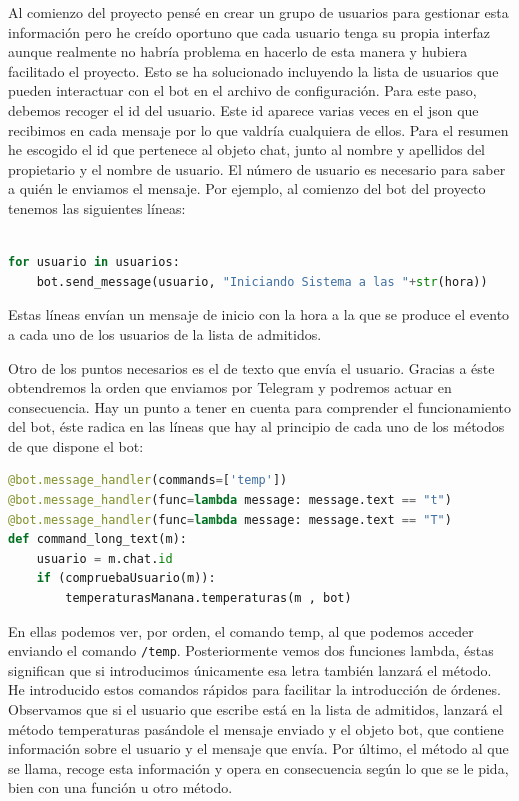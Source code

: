 Al comienzo del proyecto pensé en crear un grupo de usuarios para gestionar esta información pero he creído oportuno que cada usuario tenga su propia interfaz aunque realmente no habría problema en hacerlo de esta manera y hubiera facilitado el proyecto. Esto se ha solucionado incluyendo la lista de usuarios que pueden interactuar con el bot en el archivo de configuración. Para este paso, debemos recoger el id del usuario. Este id aparece varias veces en el json que recibimos en cada mensaje por lo que valdría cualquiera de ellos. Para el resumen he escogido el id que pertenece al objeto chat, junto al nombre y apellidos del propietario y el nombre de usuario.
El número de usuario es necesario para saber a quién le enviamos el mensaje. Por ejemplo, al comienzo del bot del proyecto tenemos las siguientes líneas:~\\~\\

\begin{lstlisting}[language=Python]
for usuario in usuarios:
    bot.send_message(usuario, "Iniciando Sistema a las "+str(hora))
\end{lstlisting}

Estas líneas envían un mensaje de inicio con la hora a la que se produce el evento a cada uno de los usuarios de la lista de admitidos.

Otro de los puntos necesarios es el de texto que envía el usuario. Gracias a éste obtendremos la orden que enviamos por Telegram y podremos actuar en consecuencia.
Hay un punto a tener en cuenta para comprender el funcionamiento del bot, éste radica en las líneas que hay al principio de cada uno de los métodos de que dispone el bot:~\\

\begin{lstlisting}[language=Python]
@bot.message_handler(commands=['temp'])
@bot.message_handler(func=lambda message: message.text == "t")
@bot.message_handler(func=lambda message: message.text == "T")
def command_long_text(m):
    usuario = m.chat.id
    if (compruebaUsuario(m)):
        temperaturasManana.temperaturas(m , bot)
\end{lstlisting}

En ellas podemos ver, por orden, el comando temp, al que podemos acceder enviando el comando \texttt{/temp}. Posteriormente vemos dos funciones lambda, éstas significan que si introducimos únicamente esa letra también lanzará el método. He introducido estos comandos rápidos para facilitar la introducción de órdenes.
Observamos que si el usuario que escribe está en la lista de admitidos, lanzará el método temperaturas pasándole el mensaje enviado y el objeto bot, que contiene información sobre el usuario y el mensaje que envía.
Por último, el método al que se llama, recoge esta información y opera en consecuencia según lo que se le pida, bien con una función u otro método.